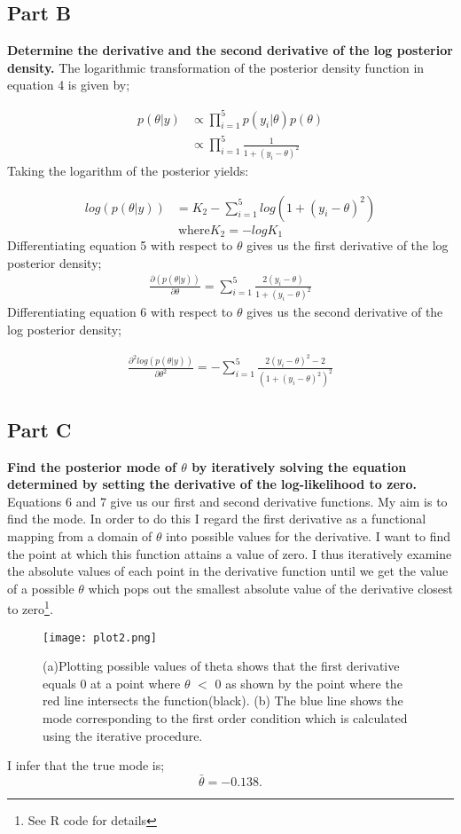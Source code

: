 \documentclass{article}
\begin{document}
\subsection{Part B}
\textbf{Determine the derivative and the second derivative of the log posterior density.}
The logarithmic transformation of the posterior density function in equation 4 is given by;

\begin{align*}
\displaystyle
p(\theta | y) & \propto \prod_{i=1}^{5} p(y_i | \theta) p(\theta)
\\ 
& \propto \prod_{i=1}^{5} \frac{1}{1 + (y_i - \theta)^2}
\end{align*}
Taking the logarithm of the posterior yields:

\begin{align}
\displaystyle
log(p(\theta | y)) &= K_2 - \sum_{i=1}^{5} log(1 + (y_i - \theta)^2)
 \end{align}
 $$\text{where} K_2 = -logK_1$$
Differentiating equation 5 with respect to $\theta$ gives us the first derivative of the log posterior density;
\begin{align}
\displaystyle
\frac{\partial(p(\theta | y))}{\partial \theta} =  \sum_{i=1}^{5} \frac{2(y_i - \theta)}{1 + (y_i - \theta)^2}
 \end{align}
  \newpage
Differentiating equation 6 with respect to $\theta$ gives us the second derivative of the log posterior density;

  \begin{align}
\displaystyle
\frac{\partial^2log(p(\theta | y))}{\partial \theta^2} = - \sum_{i=1}^{5} \frac{ 2(y_i - \theta)^2 - 2}{(1 + (y_i - \theta)^2)^2}
 \end{align}
 
 \subsection{Part C}
 \textbf{Find the posterior mode of $\theta$ by iteratively solving the equation determined by setting the derivative of the log-likelihood to zero.}\\
 Equations 6 and 7 give us our first and second derivative functions. My aim is to find the mode. In order to do this I regard the first derivative as a functional mapping from a domain of $\theta$ into possible values for the derivative. I want to find the point at which this function attains a value of zero. I thus iteratively examine the absolute values of each point in the derivative function until we get the value of a possible  $\theta$ which pops out the smallest absolute value of the derivative closest to zero\footnote{See R code for details}.\\
  \begin{figure}[H]
\centering
\texttt{[image: plot2.png]}
\caption{(a)Plotting possible values of theta shows that the first derivative equals 0 at a point where $\theta$ $<$ 0 as shown by the point where the red line intersects the function(black). (b) The blue line shows the mode corresponding to the first order condition which is calculated using the iterative procedure.}
\label{deltat}
\end{figure}
I infer that the true mode is;
$$\bar{\theta} = -0.138.$$
\newpage
\end{document}
